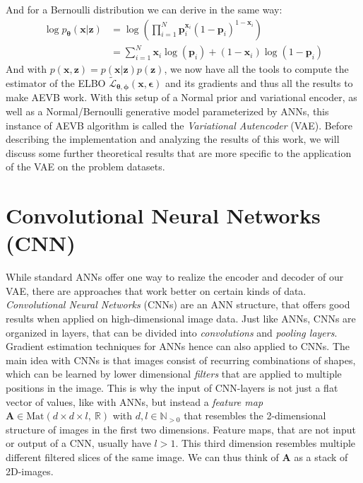\documentclass[12pt]{report}
\theoremstyle{definition}
\begin{document}
And for a Bernoulli distribution we can derive in the same way:
\begin{equation}
\begin{split}
\log p_{\pmb{\theta}}(\mathbf{x}|\mathbf{z})
& = \log \left(\prod_{i=1}^N \mathbf{p}_i^{\mathbf{x}_i}(1-\mathbf{p}_i)^{1-\mathbf{x}_i}\right) \\
& = \sum_{i=1}^N \mathbf{x}_i \log(\mathbf{p}_i) + (1 - \mathbf{x}_i) \log(1 - \mathbf{p}_i)
\end{split}
\end{equation}
And with $p(\mathbf{x}, \mathbf{z}) = p(\mathbf{x}|\mathbf{z})p(\mathbf{z})$, we now have all the tools to compute the estimator of the ELBO $\tilde{\mathcal{L}}_{\pmb{\theta}, \pmb{\phi}}(\mathbf{x}, \pmb{\epsilon})$ and its gradients and thus all the results to make AEVB work. With this setup of a Normal prior and variational encoder, as well as a Normal/Bernoulli generative model parameterized by ANNs, this instance of AEVB algorithm is called the \emph{Variational Autencoder} (VAE). Before describing the implementation and analyzing the results of this work, we will discuss some further theoretical results that are more specific to the application of the VAE on the problem datasets.



\section{Convolutional Neural Networks (CNN)}

While standard ANNs offer one way to realize the encoder and decoder of our VAE, there are approaches that work better on certain kinds of data. \emph{Convolutional Neural Networks} (CNNs) are an ANN structure, that offers good results when applied on high-dimensional image data. Just like ANNs, CNNs are organized in layers, that can be divided into \emph{convolutions} and \emph{pooling layers}. Gradient estimation techniques for ANNs hence can also applied to CNNs.
The main idea with CNNs is that images consist of recurring combinations of shapes, which can be learned by lower dimensional \emph{filters} that are applied to multiple positions in the image. This is why the input of CNN-layers is not just a flat vector of values, like with ANNs, but instead a \emph{feature map} $\mathbf{A} \in \mathrm{Mat}(d \times d \times l, \ \mathbb{R})$ with $d, l \in \mathbb{N}_{>0}$ that resembles the 2-dimensional structure of images in the first two dimensions. Feature maps, that are not input or output of a CNN, usually have $l>1$. This third dimension resembles multiple different filtered slices of the same image. We can thus think of $\mathbf{A}$ as a stack of 2D-images.
\end{document}
